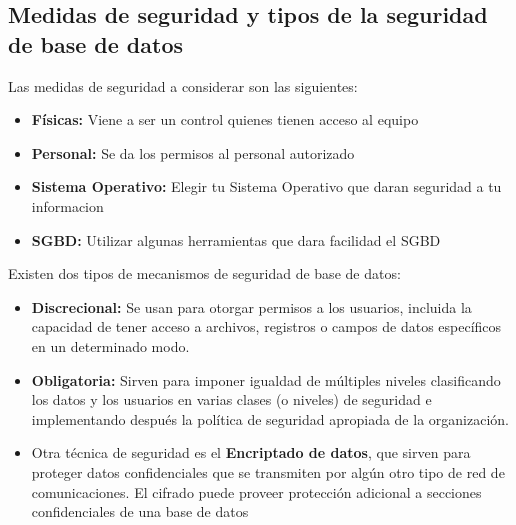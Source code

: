 \documentclass[%
 reprint,
 amsmath,amssymb,
 aps,
]{revtex4-1}
\begin{document}

\subsection{Medidas de seguridad y tipos de la seguridad de base de datos}
Las medidas de seguridad a considerar son las siguientes: 
\begin{itemize}
	\item \textbf{Físicas: }Viene a ser un control quienes tienen acceso al equipo
	\item \textbf{Personal: }Se da los permisos al personal autorizado 
	\item \textbf{Sistema Operativo: }Elegir tu Sistema Operativo que daran seguridad a tu informacion
	\item \textbf{SGBD: }Utilizar algunas herramientas que dara facilidad el SGBD
\end{itemize}
Existen dos tipos de mecanismos de seguridad de base de datos:
\begin{itemize}
	\item \textbf{Discrecional: }Se usan para otorgar permisos  a los usuarios, incluida la capacidad de tener acceso a archivos, registros o campos de datos específicos en un determinado modo.
	\item \textbf{Obligatoria: }Sirven para imponer igualdad de múltiples niveles clasificando los datos y los usuarios en varias clases (o niveles) de seguridad e implementando después la política de seguridad apropiada de la organización.
	\item Otra técnica de seguridad es el  \textbf{Encriptado de datos}, que sirven para proteger datos confidenciales que se transmiten  por algún otro tipo de red de comunicaciones. El cifrado puede proveer protección adicional a secciones confidenciales de una base de datos \cite{l}
\end{itemize}
\end{document}
